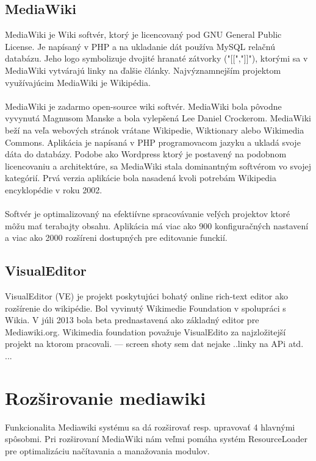 \subsection{MediaWiki}
MediaWiki je Wiki softvér, ktorý je licencovaný pod GNU General Public License. Je napísaný v PHP a na ukladanie dát používa MySQL relačnú databázu. Jeho logo symbolizuje dvojité hranaté zátvorky ("[[","]]"), ktorými sa v MediaWiki vytvárajú linky na ďalšie články. Najvýznamnejším projektom využívajúcim MediaWiki je Wikipédia.\\
\\
MediaWiki je zadarmo open-source wiki softvér. MediaWiki bola pôvodne vyvynutá Magnusom Manske a bola vylepšená Lee Daniel Crockerom. MediaWiki beží na veľa webových stránok vrátane Wikipedie, Wiktionary alebo Wikimedia Commons. Aplikácia je napísaná v PHP programovacom jazyku a ukladá svoje dáta do databázy. Podobe ako Wordpress ktorý je postavený na podobnom licencovaniu a architektúre, sa MediaWiki stala dominantným softvérom vo svojej kategórií. Prvá verzia aplikácie bola nasadená kvoli potrebám Wikipedia encyklopédie v roku 2002.\\
\\
Softvér je optimalizovaný na efektiívne spracovávanie veľých projektov ktoré môžu mať terabajty obsahu. Aplikácia má viac ako 900 konfiguračných nastavení a viac ako 2000 rozšíreni dostupných pre editovanie funckií.

\subsection{VisualEditor}
VisualEditor (VE) je projekt poskytujúci bohatý online rich-text editor ako rozšírenie do wikipédie. Bol vyvinutý Wikimedie Foundation v spolupráci s Wikia. V júli 2013 bola beta prednastavená ako základný editor pre Mediawiki.org.
Wikimedia foundation považuje VisualEdito za najzložitejší projekt na ktorom pracovali.
--- screen shoty sem dat nejake ..linky na APi atd. ...



\section{Rozširovanie mediawiki}

Funkcionalita Mediawiki systému sa dá rozširovať resp. upravovať 4 hlavnými spôsobmi. Pri rozširovaní MediaWiki nám veľmi pomáha systém ResourceLoader pre optimalizáciu načítavania a manažovania modulov.

